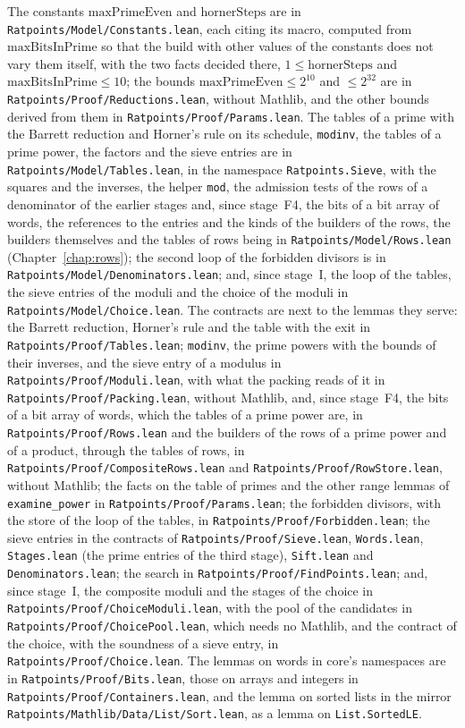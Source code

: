 The constants $\mathrm{maxPrimeEven}$ and $\mathrm{hornerSteps}$ are in
\verb|Ratpoints/Model/Constants.lean|, each citing its macro, computed from
$\mathrm{maxBitsInPrime}$ so that the build with other values of the constants does not vary them
itself, with the two facts decided there, $1 \le \mathrm{hornerSteps}$ and
$\mathrm{maxBitsInPrime} \le 10$; the bounds $\mathrm{maxPrimeEven} \le 2^{10}$ and $\le 2^{32}$ are
in \verb|Ratpoints/Proof/Reductions.lean|, without Mathlib, and the other bounds derived from them
in \verb|Ratpoints/Proof/Params.lean|. The tables of a prime with the Barrett reduction and Horner's
rule on its schedule, \verb|modinv|, the tables of a prime power, the factors and the sieve entries
are in \verb|Ratpoints/Model/Tables.lean|, in the namespace \verb|Ratpoints.Sieve|, with the squares
and the inverses, the helper \verb|mod|, the admission tests of the rows of a denominator of the
earlier stages and, since stage~F4, the bits of a bit array of words, the references to the entries
and the kinds of the builders of the rows, the builders themselves and the tables of rows being in
\verb|Ratpoints/Model/Rows.lean| (Chapter~\ref{chap:rows}); the second loop of the forbidden
divisors is in \verb|Ratpoints/Model/Denominators.lean|; and, since stage~I, the loop of the tables,
the sieve entries of the moduli and the choice of the moduli in \verb|Ratpoints/Model/Choice.lean|.
The contracts are next to the lemmas they serve: the Barrett reduction, Horner's rule and the table
with the exit in \verb|Ratpoints/Proof/Tables.lean|; \verb|modinv|, the prime powers with the bounds
of their inverses, and the sieve entry of a modulus in \verb|Ratpoints/Proof/Moduli.lean|, with what
the packing reads of it in \verb|Ratpoints/Proof/Packing.lean|, without Mathlib, and, since
stage~F4, the bits of a bit array of words, which the tables of a prime power are, in
\verb|Ratpoints/Proof/Rows.lean| and the builders of the rows of a prime power and of a product,
through the tables of rows, in \verb|Ratpoints/Proof/CompositeRows.lean| and
\verb|Ratpoints/Proof/RowStore.lean|, without Mathlib; the facts on the table of primes and the
other range lemmas of \verb|examine_power| in \verb|Ratpoints/Proof/Params.lean|; the forbidden
divisors, with the store of the loop of the tables, in \verb|Ratpoints/Proof/Forbidden.lean|; the
sieve entries in the contracts of \verb|Ratpoints/Proof/Sieve.lean|, \verb|Words.lean|,
\verb|Stages.lean| (the prime entries of the third stage), \verb|Sift.lean| and
\verb|Denominators.lean|; the search in \verb|Ratpoints/Proof/FindPoints.lean|; and, since stage~I,
the composite moduli and the stages of the choice in \verb|Ratpoints/Proof/ChoiceModuli.lean|, with
the pool of the candidates in \verb|Ratpoints/Proof/ChoicePool.lean|, which needs no Mathlib, and
the contract of the choice, with the soundness of a sieve entry, in
\verb|Ratpoints/Proof/Choice.lean|. The lemmas on words in core's namespaces are in
\verb|Ratpoints/Proof/Bits.lean|, those on arrays and integers in
\verb|Ratpoints/Proof/Containers.lean|, and the lemma on sorted lists in the mirror
\verb|Ratpoints/Mathlib/Data/List/Sort.lean|, as a lemma on \verb|List.SortedLE|.

